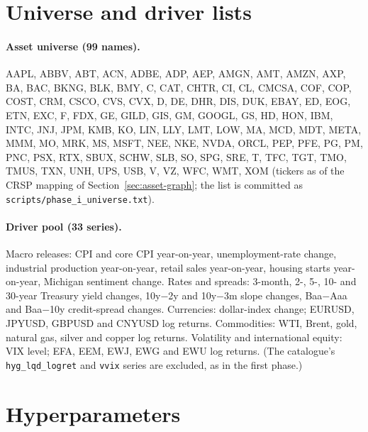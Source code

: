 \section{Universe and driver lists}
\label{app:universe}

\paragraph{Asset universe (99 names).} AAPL, ABBV, ABT, ACN, ADBE, ADP,
AEP, AMGN, AMT, AMZN, AXP, BA, BAC, BKNG, BLK, BMY, C, CAT, CHTR, CI, CL,
CMCSA, COF, COP, COST, CRM, CSCO, CVS, CVX, D, DE, DHR, DIS, DUK, EBAY,
ED, EOG, ETN, EXC, F, FDX, GE, GILD, GIS, GM, GOOGL, GS, HD, HON, IBM,
INTC, JNJ, JPM, KMB, KO, LIN, LLY, LMT, LOW, MA, MCD, MDT, META, MMM, MO,
MRK, MS, MSFT, NEE, NKE, NVDA, ORCL, PEP, PFE, PG, PM, PNC, PSX, RTX,
SBUX, SCHW, SLB, SO, SPG, SRE, T, TFC, TGT, TMO, TMUS, TXN, UNH, UPS,
USB, V, VZ, WFC, WMT, XOM (tickers as of the CRSP mapping of
Section~\ref{sec:asset-graph}; the list is committed as
\texttt{scripts/phase\_i\_universe.txt}).

\paragraph{Driver pool (33 series).} Macro releases: CPI and core CPI
year-on-year, unemployment-rate change, industrial production
year-on-year, retail sales year-on-year, housing starts year-on-year,
Michigan sentiment change. Rates and spreads: 3-month, 2-, 5-, 10- and
30-year Treasury yield changes, 10y$-$2y and 10y$-$3m slope changes,
Baa$-$Aaa and Baa$-$10y credit-spread changes. Currencies: dollar-index
change; EURUSD, JPYUSD, GBPUSD and CNYUSD log returns. Commodities: WTI,
Brent, gold, natural gas, silver and copper log returns. Volatility and
international equity: VIX level; EFA, EEM, EWJ, EWG and EWU log returns.
(The catalogue's \texttt{hyg\_lqd\_logret} and \texttt{vvix} series are
excluded, as in the first phase.)

\section{Hyperparameters}

